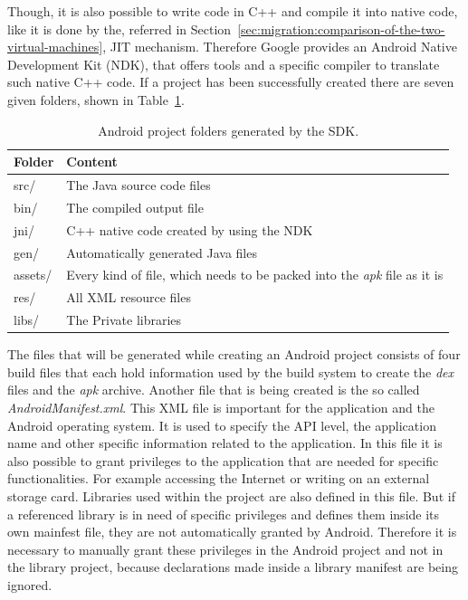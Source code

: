 Though, it is also possible to write code in C++ and compile it into native code, like it is done by the, referred in Section~\ref{sec:migration:comparison-of-the-two-virtual-machines}, JIT mechanism.
Therefore Google provides an Android Native Development Kit (NDK), that offers tools and a specific compiler to translate such native C++ code.
If a project has been successfully created there are seven given folders, shown in Table~\ref{tab:android-project-folders}.
\begin {table}[htpb] 
  \centering
\begin {tabular} {|l|l|}
	\hline
	Folder&Content\\
	\hline
	src/&The Java source code files\\
	\hline
	bin/&The compiled output file\\
	\hline
	jni/&C++ native code created by using the NDK\\
	\hline
	gen/&Automatically generated Java files\\
	\hline
	assets/&Every kind of file, which needs to be packed into the \textit{apk} file as it is\\
	\hline
	res/&All XML resource files\\
	\hline
	libs/&The Private libraries\\
	\hline
\end {tabular}
\caption {Android project folders generated by the SDK.}
\label {tab:android-project-folders}
\end {table}

The files that will be generated while creating an Android project consists of four build files that each hold information used by the build system to create the \textit{dex} files and the \textit{apk} archive.
Another file that is being created is the so called \textit{AndroidManifest.xml}.
This XML file is important for the application and the Android operating system.
It is used to specify the API level, the application name and other specific information related to the application.
In this file it is also possible to grant privileges to the application that are needed for specific functionalities.
For example accessing the Internet or writing on an external storage card.
Libraries used within the project are also defined in this file.
But if a referenced library is in need of specific privileges and defines them inside its own mainfest file, they are not automatically granted by Android.
Therefore it is necessary to manually grant these privileges in the Android project and not in the library project, because declarations made inside a library manifest are being ignored.


